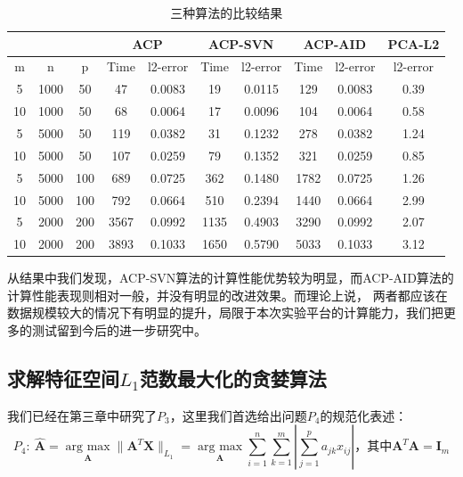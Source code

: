\begin{table}[H]
    \small
    \centering
    \caption{三种算法的比较结果}
    \label{three-l1-pca}
    \begin{tabular}{@{}cccccccccc@{}}
    \toprule
       &      &     & \multicolumn{2}{c}{ACP} & \multicolumn{2}{c}{ACP-SVN} & \multicolumn{2}{c}{ACP-AID} & PCA-L2   \\ \midrule
    m  & n    & p   & Time     & l2-error     & Time       & l2-error       & Time       & l2-error       & l2-error \\ \midrule
    5  & 1000  & 50  & 47       & 0.0083       & 19         & 0.0115         & 129        & 0.0083         & 0.39     \\
    10 & 1000  & 50  & 68       & 0.0064       & 17         & 0.0096         & 104        & 0.0064         & 0.58     \\
    5  & 5000 & 50  & 119      & 0.0382       & 31         & 0.1232         & 278        & 0.0382         & 1.24     \\
    10 & 5000 & 50  & 107      & 0.0259       & 79         & 0.1352         & 321        & 0.0259         & 0.85     \\
    5  & 5000 & 100 & 689      & 0.0725       & 362        & 0.1480         & 1782       & 0.0725         & 1.26     \\
    10 & 5000 & 100 & 792      & 0.0664       & 510        & 0.2394         & 1440       & 0.0664         & 2.99     \\
    5  & 2000  & 200 & 3567     & 0.0992       & 1135       & 0.4903         & 3290       & 0.0992         & 2.07     \\
    10 & 2000  & 200 & 3893     & 0.1033       & 1650       & 0.5790         & 5033       & 0.1033         & 3.12     \\ \bottomrule
    \end{tabular}
\end{table}

从结果中我们发现，ACP-SVN算法的计算性能优势较为明显，而ACP-AID算法的计算性能表现则相对一般，并没有明显的改进效果。而理论上说，
两者都应该在数据规模较大的情况下有明显的提升，局限于本次实验平台的计算能力，我们把更多的测试留到今后的进一步研究中。

\subsection{求解特征空间$L_1$范数最大化的贪婪算法}

我们已经在第三章中研究了$P_3$，这里我们首选给出问题$P_4$的规范化表述：
\begin{equation}\label{p4}
    P_4: \ \hat{\bm A} = \underset{\bm{A}}{\operatorname{arg \ max}} \| \bm A^T \bm X\|_{L_1}
    = \underset{\bm A}{\operatorname{arg\ max}} 
    \sum_{i=1}^{n}\sum_{k=1}^{m}|\sum_{j=1}^p{a}_{jk}x_{ij}|
     \text{，其中}\bm A^T\bm A = \bm I_m
\end{equation}

